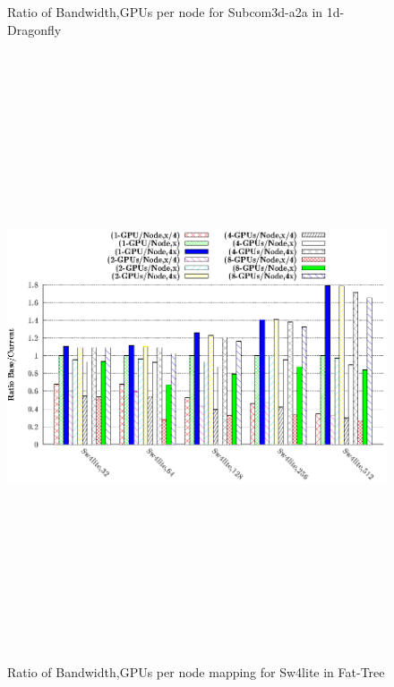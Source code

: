 \documentclass[final]{beamer}
\newlength{\onecolwid}
\newlength{\twocolwid}
\begin{document}
\begin{frame}[t]
\begin{columns}[t]
\begin{column}{\twocolwid}
\begin{columns}[t,totalwidth=\twocolwid]
\begin{column}{\onecolwid}
\begin{figure}
\begin{minipage}{1\textwidth}
\captionsetup{labelformat=empty}
\caption{Ratio of Bandwidth,GPUs per node for Subcom3d-a2a in 1d-Dragonfly}
\end{minipage}
\end{figure}
\begin{figure}
\centering
\begin{minipage}{1\textwidth}
\centering
\includegraphics[width=1\linewidth, height=18cm]{figs/ftree-bw-mapping-comp-sw4lite.eps}
\captionsetup{labelformat=empty}
\caption{Ratio of Bandwidth,GPUs per node mapping for Sw4lite in Fat-Tree}
\end{minipage}
\end{figure}



\end{column}
\end{columns}
\end{column}
\end{columns}
\end{frame}
\end{document}

